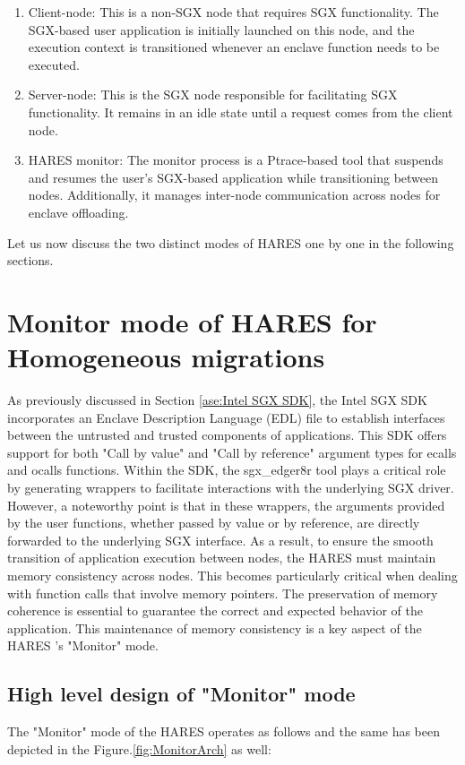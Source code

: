 \documentclass[article, doublespace,nopageskip]{VTthesis} %
\newcommand{\monitor}{HARES }
\begin{document}
    \begin{enumerate}
        \item Client-node: This is a non-SGX node that requires SGX functionality. The SGX-based user application is initially launched on this node, and the execution context is transitioned whenever an enclave function needs to be executed.
        \item Server-node: This is the SGX node responsible for facilitating SGX functionality. It remains in an idle state until a request comes from the client node.
        \item \monitor monitor: The monitor process is a Ptrace-based tool that suspends and resumes the user's SGX-based application while transitioning between nodes. Additionally, it manages inter-node communication across nodes for enclave offloading. 
    \end{enumerate}
    
    Let us now discuss the two distinct modes of \monitor one by one in the following sections. 

    \section{Monitor mode of \monitor for Homogeneous migrations} \label{ase: Monitor mode}
    As previously discussed in Section \ref{ase:Intel SGX SDK}, the Intel SGX SDK incorporates an Enclave Description Language (EDL) file to establish interfaces between the untrusted and trusted components of applications. This SDK offers support for both "Call by value" and "Call by reference" argument types for ecalls and ocalls functions. Within the SDK, the sgx\_edger8r tool plays a critical role by generating wrappers to facilitate interactions with the underlying SGX driver. However, a noteworthy point is that in these wrappers, the arguments provided by the user functions, whether passed by value or by reference, are directly forwarded to the underlying SGX interface. As a result, to ensure the smooth transition of application execution between nodes, the \monitor must maintain memory consistency across nodes. This becomes particularly critical when dealing with function calls that involve memory pointers. The preservation of memory coherence is essential to guarantee the correct and expected behavior of the application. This maintenance of memory consistency is a key aspect of the \monitor's "Monitor" mode.

    \subsection{High level design of "Monitor" mode} \label{ase: highlevel_design_monitor}
    The "Monitor" mode of the \monitor operates as follows and the same has been depicted in the Figure.\ref{fig:MonitorArch} as well:
\end{document}
